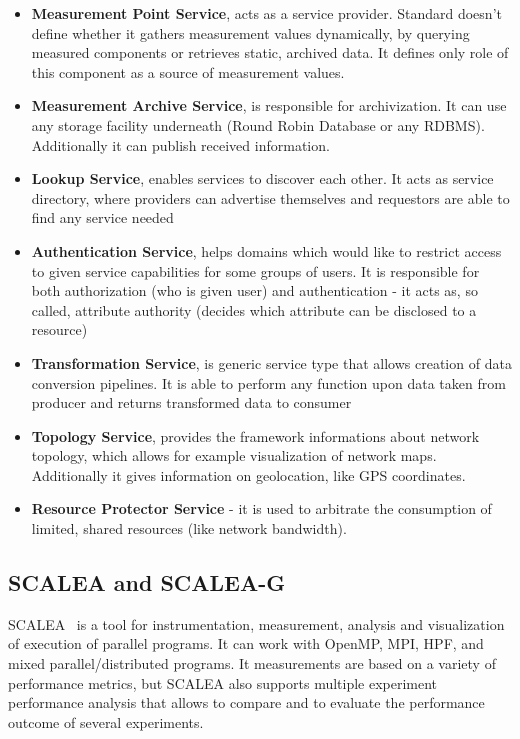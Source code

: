 \begin{itemize}
\item{ {\bf Measurement Point Service}, acts as a service provider. Standard doesn\rq{}t define whether it gathers measurement values
dynamically, by querying measured components or retrieves static, archived data. It defines only role of this component as a source of
measurement values.}
\item{ {\bf Measurement Archive Service}, is responsible for archivization. It can use any storage facility underneath (Round Robin Database or
any RDBMS). Additionally it can publish received information. }
\item{ {\bf Lookup Service}, enables services to discover each other. It acts as service directory, where providers can advertise themselves and
requestors are able to find any service needed}
\item{ {\bf Authentication Service}, helps domains which would like to restrict access to given service capabilities for some groups of users. It is
responsible for both authorization (who is given user) and authentication - it acts as, so called, attribute authority (decides which attribute can be 
disclosed to a resource)}
\item{ {\bf Transformation Service}, is generic service type that allows creation of data conversion pipelines. It is able to perform any function
upon data taken from producer and returns transformed data to consumer}
\item{ {\bf Topology Service}, provides the framework informations about network topology, which allows for example visualization of network
maps. Additionally it gives information on geolocation, like GPS coordinates.}
\item{ {\bf Resource Protector Service} - it is used to arbitrate the consumption of limited, shared resources (like network bandwidth).}
\end{itemize}

\subsection{SCALEA and SCALEA-G}

SCALEA~\cite{SCALEA1} is a tool for instrumentation, measurement, analysis and visualization of execution of parallel programs. It can work with
OpenMP, MPI, HPF, and mixed parallel/distributed programs. It measurements are based on a variety of performance metrics, but SCALEA
also supports multiple experiment performance analysis that allows to compare and to evaluate the performance
outcome of several experiments.

